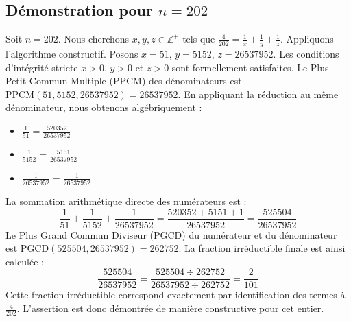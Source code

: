 \documentclass[11pt,a4paper]{article}
\begin{document}
\subsection{Démonstration pour $n = 202$}
Soit $n = 202$. Nous cherchons $x, y, z \in \mathbb{Z}^{+}$ tels que $\frac{4}{202} = \frac{1}{x} + \frac{1}{y} + \frac{1}{z}$.
Appliquons l'algorithme constructif. Posons $x = 51$, $y = 5152$, $z = 26537952$.
Les conditions d'intégrité stricte $x > 0$, $y > 0$ et $z > 0$ sont formellement satisfaites.
Le Plus Petit Commun Multiple (PPCM) des dénominateurs est $\text{PPCM}(51, 5152, 26537952) = 26537952$.
En appliquant la réduction au même dénominateur, nous obtenons algébriquement :
\begin{itemize}
    \item $\frac{1}{51} = \frac{520352}{26537952}$
    \item $\frac{1}{5152} = \frac{5151}{26537952}$
    \item $\frac{1}{26537952} = \frac{1}{26537952}$
\end{itemize}
La sommation arithmétique directe des numérateurs est :
$$ \frac{1}{51} + \frac{1}{5152} + \frac{1}{26537952} = \frac{520352 + 5151 + 1}{26537952} = \frac{525504}{26537952} $$
Le Plus Grand Commun Diviseur (PGCD) du numérateur et du dénominateur est $\text{PGCD}(525504, 26537952) = 262752$.
La fraction irréductible finale est ainsi calculée :
$$ \frac{525504}{26537952} = \frac{525504 \div 262752}{26537952 \div 262752} = \frac{2}{101} $$
Cette fraction irréductible correspond exactement par identification des termes à $\frac{4}{202}$. L'assertion est donc démontrée de manière constructive pour cet entier.
\end{document}
